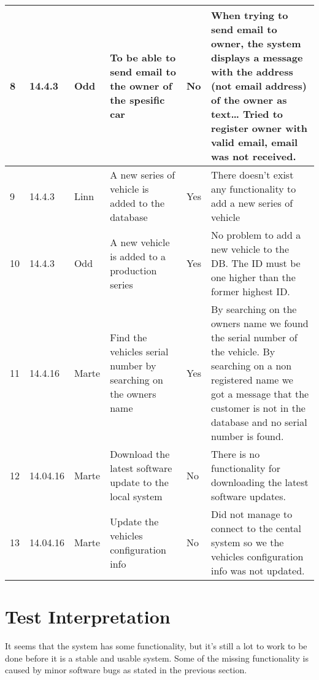 \begin{center}
\begin{longtable}{| l | l | l | p{3cm}  | l | p{5cm} |}
	    8 
	    & 14.4.3 
	    & Odd 
	    & To be able to send email to the owner of the spesific car 
	    & No 
	    & When trying to send email to owner, the system displays a message with the address 
	    (not email address) of the owner as text… Tried to register owner with valid email, 
	    email was not received. \\ \hline

	    9 
	    & 14.4.3 
	    & Linn 
	    & A new series of vehicle is added to the database 
	    & Yes & There doesn't exist any functionality to add a new series of vehicle \\ \hline

	    10 
	    & 14.4.3 
	    & Odd 
	    & A new vehicle is added to a production series 
	    & Yes 
	    & No problem to add a new vehicle to the DB. The ID must be one higher than the 
	    former highest ID. \\ \hline

	    11 
	    & 14.4.16 
	    & Marte 
	    & Find the vehicles serial number by searching on the owners name 
	    & Yes 
	    & By searching on the owners name we found the serial number of the vehicle. By searching 
	    on a non registered name we got a message that the customer is not in the database and 
	    no serial number is found. \\ \hline

	    12 
	    & 14.04.16 
	    & Marte 
	    & Download the latest software update to the local system 
	    & No 
	    & There is no functionality for downloading the latest software updates. \\ \hline

	    13 
	    & 14.04.16 
	    & Marte 
	    & Update the vehicles configuration info 
	    & No 
	    & Did not manage to connect to the cental system so we the vehicles configuration 
	    info was not updated. \\ \hline 

	    \hline
	    \end{longtable}
	\end{center}

	\section{Test Interpretation}

		It seems that the system has some functionality, but it’s still a lot to work to be 
		done before it is a stable and usable system. Some of the missing functionality is 
		caused by minor software bugs as stated in the previous section.

